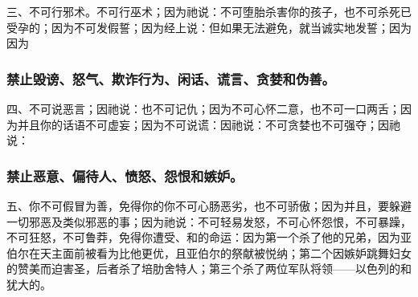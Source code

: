 三、不可行邪术。不可行巫术；因为祂说：不可堕胎杀害你的孩子，也不可杀死已受孕的；因为不可发假誓；因为经上说：但如果无法避免，就当诚实地发誓；因为因为\par


\subsubsection{禁止毁谤、怒气、欺诈行为、闲话、谎言、贪婪和伪善。}

四、不可说恶言；因祂说：也不可记仇；因为不可心怀二意，也不可一口两舌；因为并且你的话语不可虚妄；因为不可说谎：因祂说：不可贪婪也不可强夺；因祂说：\par


\subsubsection{禁止恶意、偏待人、愤怒、怨恨和嫉妒。}

五、你不可假冒为善，免得你的你不可心肠恶劣，也不可骄傲；因为并且，要躲避一切邪恶及类似邪恶的事；因为祂说：不可轻易发怒，不可心怀怨恨，不可暴躁，不可狂怒，不可鲁莽，免得你遭受、和的命运：因为第一个杀了他的兄弟，因为亚伯尔在天主面前被看为比他更优，且亚伯尔的祭献被悦纳；第二个因嫉妒跳舞妇女的赞美而迫害圣，后者杀了培肋舍特人；第三个杀了两位军队将领——以色列的和犹大的。\par

